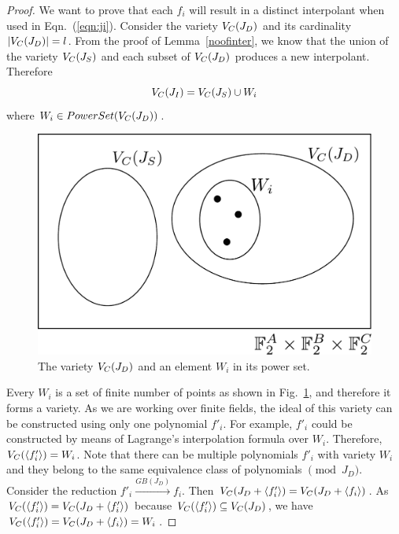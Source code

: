 \begin{proof}

We want to prove that each $f_i$ will result in a 
distinct interpolant when used in Eqn.~(\ref{eqn:ji}). Consider the variety ${V_C}(J_D)$
and its cardinality $|{V_C}(J_D)| = l$. From the proof of Lemma~\ref{noofinter}, we know that
the union of the variety ${V_C}(J_S)$ and each subset of  ${V_C}(J_D)$ produces a new 
interpolant. Therefore
\begin{equation}
\label{eqn:jsuwi}
{V_C}(J_I) = {V_C}(J_S) \cup W_i 
\end{equation}
where $W_i \in PowerSet({V_C}(J_D))$.
\begin{figure}[hbt]
\centering
\includegraphics[scale=0.30]{vjd.pdf}
\caption{The variety ${V_C}(J_D)$ and an element $W_i$ in its power set.}
\label{Fig:vjd}
\end{figure}  
\par Every $W_i$ is a set of finite number of points as shown in Fig.~\ref{Fig:vjd}, and 
therefore it forms a variety. As we are working over finite fields, the ideal of this variety 
can be constructed using only one polynomial $f'_i$. For example, $f'_i$ could be constructed by
means of Lagrange's interpolation formula over $W_i$. Therefore,
${V_C}(\langle f'_i \rangle) = W_i$. Note that there can be multiple polynomials
$f'_i$ with variety $W_i$ and they belong to the same equivalence class of polynomials
$\pmod{J_D}$. Consider the reduction $f'_i \xrightarrow{GB(J_D)} f_i$. Then
${V_C}(J_D+\langle f'_i \rangle) = {V_C}(J_D + \langle f_i \rangle)$.
As ${V_C}(\langle f'_i \rangle) = {V_C}(J_D + \langle f'_i \rangle)$ because ${V_C}
(\langle f'_i \rangle) \subseteq {V_C}(J_D)$, we have ${V_C}(\langle f'_i \rangle) =
{V_C}(J_D + \langle f_i \rangle) = W_i$.


\end{proof}
